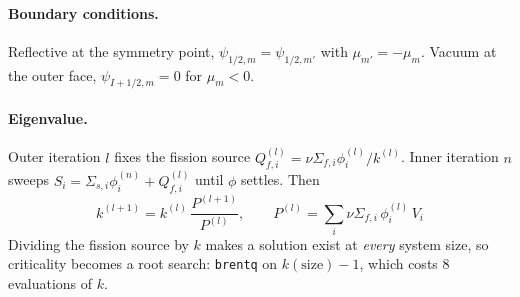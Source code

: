 \documentclass[11pt]{article}
\begin{document}
\paragraph{Boundary conditions.} Reflective at the symmetry point, $\psi_{1/2,m} = \psi_{1/2,m'}$ with $\mu_{m'}=-\mu_m$. Vacuum at the outer face, $\psi_{I+1/2,m}=0$ for $\mu_m<0$.

\paragraph{Eigenvalue.} Outer iteration $l$ fixes the fission source $Q_{f,i}^{(l)} = \nu\Sigma_{f,i}\phi_i^{(l)}/k^{(l)}$. Inner iteration $n$ sweeps $S_i = \Sigma_{s,i}\phi_i^{(n)} + Q_{f,i}^{(l)}$ until $\phi$ settles. Then
\begin{equation}
    k^{(l+1)} = k^{(l)}\,\frac{P^{(l+1)}}{P^{(l)}},
    \qquad P^{(l)} = \sum_i \nu\Sigma_{f,i}\,\phi_i^{(l)}\,V_i
\end{equation}
Dividing the fission source by $k$ makes a solution exist at \emph{every} system size, so criticality becomes a root search: \texttt{brentq} on $k(\text{size})-1$, which costs 8 evaluations of $k$.
\end{document}
